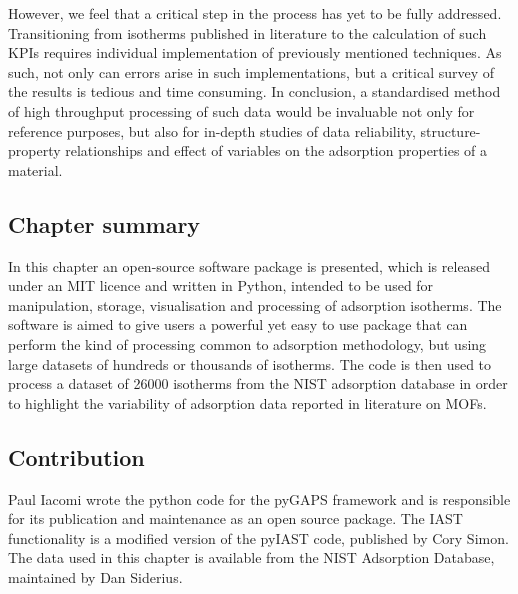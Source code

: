 However, we feel that a critical step in the process has yet 
to be fully addressed. Transitioning from isotherms published in 
literature to the calculation of such KPIs requires individual 
implementation of previously mentioned techniques. As such,
not only can errors arise in such implementations, but 
a critical survey of the results is tedious and time consuming.
In conclusion, a standardised method of high throughput processing
of such data would be invaluable not only for reference purposes,
but also for in-depth studies of data reliability, 
structure-property relationships and effect of variables on 
the adsorption properties of a material.

\subsection*{Chapter summary}

In this chapter an open-source software package is presented, which 
is released under an MIT licence and written in Python, intended to be
used for manipulation, storage, visualisation and processing of
adsorption isotherms. The software is aimed to give users a powerful 
yet easy to use package that can perform the kind of processing 
common to adsorption methodology, but using large datasets of hundreds
or thousands of isotherms. The code is then used to process a 
dataset of 26000 isotherms from the NIST adsorption database in order
to highlight the variability of adsorption data reported in literature
on MOFs.  

\subsection*{Contribution}

Paul Iacomi wrote the python code for the pyGAPS framework and is 
responsible for its publication and maintenance as an open source
package. The IAST functionality is a modified version of
the pyIAST code, published by Cory Simon. The data used in this chapter 
is available from the NIST Adsorption Database, maintained by Dan Siderius.
